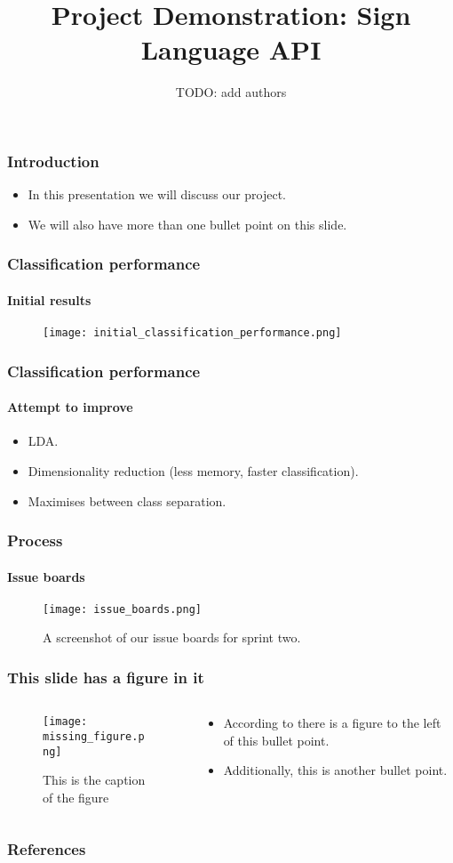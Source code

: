 \documentclass{beamer}
\title{Project Demonstration: Sign Language API}
\author{TODO: add authors}
\date{}
\begin{document}
\begin{frame}[t]
	\titlepage
\end{frame}

\begin{frame}[t]
	\frametitle{Introduction}
	\begin{itemize}
		\item In this presentation we will discuss our project.
		\item We will also have more than one bullet point on this slide.
	\end{itemize}
\end{frame}

\begin{frame}[t]
	\frametitle{Classification performance}
	\framesubtitle{Initial results}
	\begin{figure}
		\texttt{[image: initial\_classification\_performance.png]}
	\end{figure}
\end{frame}

\begin{frame}[t]
	\frametitle{Classification performance}
	\framesubtitle{Attempt to improve}
	\begin{itemize}
		\item LDA.
		\item Dimensionality reduction (less memory, faster classification).
		\item Maximises between class separation.
	\end{itemize}
\end{frame}

\begin{frame}[t]
	\frametitle{Process}
	\framesubtitle{Issue boards}
	\begin{figure}
		\texttt{[image: issue\_boards.png]}
		\caption{A screenshot of our issue boards for sprint two.}
	\end{figure}
\end{frame}

\begin{frame}[t]
	\frametitle{This slide has a figure in it}
	\begin{columns}
	\begin{column}{0.5\textwidth}
		\begin{figure}
			\texttt{[image: missing\_figure.png]}
			\caption{This is the caption of the figure}
			\label{fig:missing_figure}
		\end{figure}
		\end{column}
		\begin{column}{0.5\textwidth}
			\begin{itemize}
				\item According to \cite{me} there is a figure to the left of this bullet point.
				\item Additionally, this is another bullet point.
			\end{itemize}
		\end{column}
	\end{columns}
\end{frame}

\begin{frame}[t]
	\frametitle{References}
	
	
\end{frame}
\end{document}
